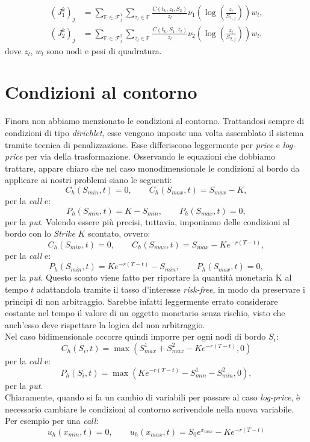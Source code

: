 \documentclass[a4paper,10pt]{report}
\theoremstyle{plain}
\theoremstyle{definition}
\theoremstyle{remark}
\begin{document}
\begin{align*}
 (J_1^{k})_j&=\sum\limits_{\mathbb{F}\in \mathcal{F}^1_j} \sum\limits_{z_l \in \mathbb{F}}\frac{C(t_k,z_l,S_2)}{z_l}\nu_1\left(\log\left(\frac{z_l}{S_{1,j}}\right)\right)w_l,\\
 (J_2^{k})_j&=\sum\limits_{\mathbb{F}\in \mathcal{F}^2_j} \sum\limits_{z_l \in \mathbb{F}}\frac{C(t_k,S_1,z_l)}{z_l}\nu_2\left(\log\left(\frac{z_l}{S_{2,j}}\right)\right)w_l,
\end{align*}
dove $z_l$, $w_l$ sono nodi e pesi di quadratura.

\section{Condizioni al contorno}
Finora non abbiamo menzionato le condizioni al contorno. Trattandosi sempre di condizioni di tipo \emph{dirichlet}, esse vengono imposte una volta assemblato il sistema tramite tecnica di penalizzazione. Esse differiscono leggermente per \emph{price} e \emph{log-price} per via della trasformazione. Osservando le equazioni che dobbiamo trattare, appare chiaro che nel caso monodimensionale le condizioni al bordo da applicare ai nostri problemi siano le seguenti: $$C_h(S_{min},t)=0, \qquad C_h(S_{max},t)=S_{max}-K,$$ per la \emph{call} e:
\begin{equation}
\label{putam_cc}
P_h(S_{min},t)=K-S_{min}, \qquad P_h(S_{max},t)=0,
\end{equation}
per la \emph{put}. Volendo essere pi\`u precisi, tuttavia, imponiamo delle condizioni al bordo con lo \emph{Strike} $K$ scontato, ovvero: $$C_h(S_{min},t)=0, \qquad C_h(S_{max},t)=S_{max}-Ke^{-r(T-t)},$$ per la \emph{call} e: $$P_h(S_{min},t)=Ke^{-r(T-t)}-S_{min}, \qquad P_h(S_{max},t)=0,$$ per la \emph{put}. Questo sconto viene fatto per riportare la quantità monetaria K al tempo $t$ adattandola tramite il tasso d'interesse \emph{risk-free}, in modo da preservare i principi di non arbitraggio. Sarebbe infatti leggermente errato considerare costante nel tempo il valore di un oggetto monetario senza rischio, visto che anch'esso deve rispettare la logica del non arbitraggio.\\Nel caso bidimensionale occorre quindi imporre per ogni nodi di bordo $S_i$: $$C_h(S_i,t)=\max\left(S^1_{max}+S^2_{max}-Ke^{-r(T-t)},0\right)$$per la \emph{call} e: $$P_h(S_i,t)=\max\left(Ke^{-r(T-t)}-S^1_{min}-S^2_{min},0\right),$$ per la \emph{put}.\\
Chiaramente, quando si fa un cambio di variabili per passare al caso \emph{log-price}, è necessario cambiare le condizioni al contorno scrivendole nella nuova variabile. Per esempio per una \emph{call}:
\begin{equation*}
 u_h(x_{min},t)=0, \qquad u_h(x_{max},t)=S_0 e^{x_{max}}-Ke^{-r(T-t)}
\end{equation*}
\end{document}
